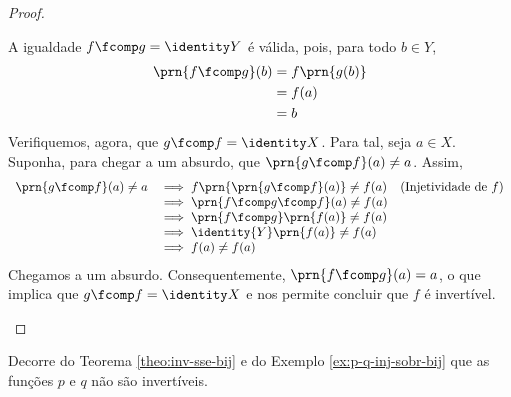 \begin{proof}
\begin{itemize}
        A igualdade $f \fcomp g = \identity Y$ é válida, pois, para todo $b \in Y$,
        \begin{align*}
            \prn{f \fcomp g}(b) & = f\prn{g(b)} \\ &= f(a) \\ &= b
        \end{align*}
        Verifiquemos, agora, que $g \fcomp f = \identity X$.
        Para tal, seja $a \in X$.
        Suponha, para chegar a um absurdo, que $\prn{g \fcomp f}(a) \ne a$.
        Assim,
        \begin{equation*}
            \begin{array}{rlc}
                \prn{g \fcomp f}(a) \ne a & \implies f\prn{\prn{g \fcomp f}(a)} \ne f(a) & (\text{Injetividade de $f$}) \\
                & \implies \prn{f \fcomp g \fcomp f}(a) \ne f(a) & \\
                & \implies \prn{f \fcomp g}\prn{f(a)} \ne f(a) & \\
                & \implies \identity{Y}\prn{f(a)} \ne f(a) & \\
                & \implies f(a) \ne f(a) &
            \end{array}
        \end{equation*}
        Chegamos a um absurdo.
        Consequentemente, $\prn{f \fcomp g}(a) = a$, o que implica que $g \fcomp f = \identity X$ e nos permite concluir que $f$ é invertível.
        
    \end{itemize}
\end{proof}

\begin{example}
    Decorre do Teorema \ref{theo:inv-sse-bij} e do Exemplo \ref{ex:p-q-inj-sobr-bij} que as funções $p$ e $q$ não são invertíveis.
\end{example}